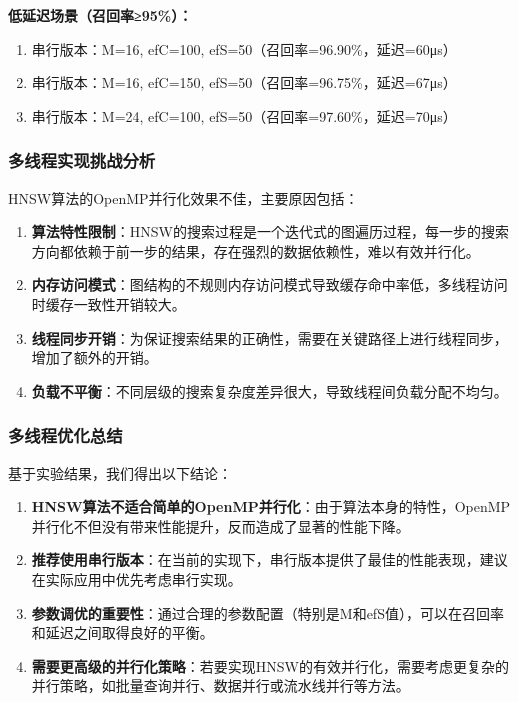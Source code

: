 \textbf{低延迟场景（召回率≥95\%）：}
\begin{enumerate}
    \item 串行版本：M=16, efC=100, efS=50（召回率=96.90\%，延迟=60μs）
    \item 串行版本：M=16, efC=150, efS=50（召回率=96.75\%，延迟=67μs）
    \item 串行版本：M=24, efC=100, efS=50（召回率=97.60\%，延迟=70μs）
\end{enumerate}

\subsubsection{多线程实现挑战分析}

HNSW算法的OpenMP并行化效果不佳，主要原因包括：

\begin{enumerate}
    \item \textbf{算法特性限制}：HNSW的搜索过程是一个迭代式的图遍历过程，每一步的搜索方向都依赖于前一步的结果，存在强烈的数据依赖性，难以有效并行化。
    
    \item \textbf{内存访问模式}：图结构的不规则内存访问模式导致缓存命中率低，多线程访问时缓存一致性开销较大。
    
    \item \textbf{线程同步开销}：为保证搜索结果的正确性，需要在关键路径上进行线程同步，增加了额外的开销。
    
    \item \textbf{负载不平衡}：不同层级的搜索复杂度差异很大，导致线程间负载分配不均匀。
\end{enumerate}

\subsubsection{多线程优化总结}

基于实验结果，我们得出以下结论：

\begin{enumerate}
    \item \textbf{HNSW算法不适合简单的OpenMP并行化}：由于算法本身的特性，OpenMP并行化不但没有带来性能提升，反而造成了显著的性能下降。
    
    \item \textbf{推荐使用串行版本}：在当前的实现下，串行版本提供了最佳的性能表现，建议在实际应用中优先考虑串行实现。
    
    \item \textbf{参数调优的重要性}：通过合理的参数配置（特别是M和efS值），可以在召回率和延迟之间取得良好的平衡。
    
    \item \textbf{需要更高级的并行化策略}：若要实现HNSW的有效并行化，需要考虑更复杂的并行策略，如批量查询并行、数据并行或流水线并行等方法。
\end{enumerate} 